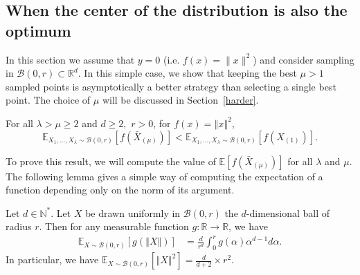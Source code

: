 \subsection{When the center of the distribution is also the optimum} \label{easier}
In this section we assume that $y=0$ (i.e. $f(x)=\lVert x\rVert ^2$) and consider sampling in $\mathcal{B}(0,r)\subset \mathbb{R}^d$. In this simple case, we show that keeping the best $\mu>1$ sampled points is asymptotically a better strategy than selecting a single best point. The choice of $\mu$ will be discussed in Section~\ref{harder}.
\begin{thm}
\label{thm:k_avg_best_vs_1_best}For all $\lambda>\mu\geq2$  and $d\geq2,$ $r>0$,
for $f(x)=\left\Vert x\right\Vert ^{2}$,
\[
\mathbb{E}_{X_1,...,X_\lambda\sim \mathcal{B}(0,r)}\left[f\left(\bar{X}_{(\mu)}\right)\right]<\mathbb{E}_{X_1,...,X_\lambda\sim \mathcal{B}(0,r)}\left[f\left(X_{(1)}\right)\right].
\]
\end{thm}
To prove this result, we will compute the value of $\mathbb{E}\left[f\left(\bar{X}_{(\mu)}\right)\right]$ for all $\lambda$ and $\mu$. The following lemma gives a simple way of computing the expectation of a function depending only on the norm of its argument.
\begin{lemma}
\label{lem:ball_volume} Let $d\in \mathbb{N}^*$. Let $X$ be drawn uniformly in $\mathcal{B}(0,r)$ the $d$-dimensional ball of radius $r$.
Then for any measurable function $g:\mathbb{R}\rightarrow\mathbb{R}$, we have 
\begin{align*}
\mathbb{E}_{X\sim\mathcal{B}(0,r)}\left[g\left(\left\Vert X\right\Vert \right)\right] & =\frac{d}{r^d}\int_{0}^{r}g\left(\alpha\right)\alpha^{d-1}d\alpha.
\end{align*}
In particular, we have
$\mathbb{E}_{X\sim\mathcal{B}(0,r)}\left[\left\Vert X\right\Vert ^{2}\right] =\frac{d}{d+2}\times r^{2}$.
\end{lemma}
